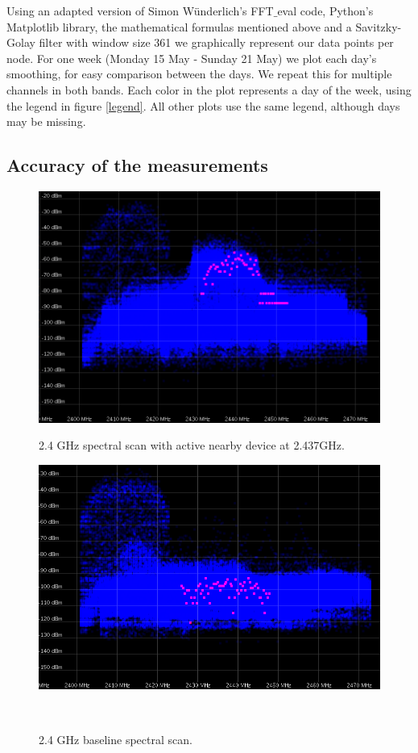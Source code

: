 \documentclass[a4paper, 11pt]{article}
\begin{document}
Using an adapted version of Simon W{\"u}nderlich's FFT$\_$eval code, Python's Matplotlib library, the mathematical formulas mentioned above and a Savitzky-Golay filter with window size 361 we graphically represent our data points per node. For one week (Monday 15 May - Sunday 21 May) we plot each day's smoothing, for easy comparison between the days. We repeat this for multiple channels in both bands. Each color in the plot represents a day of the week, using the legend in figure \ref{legend}. All other plots use the same legend, although days may be missing.



\subsection{Accuracy of the measurements} \label{accuracy}

\begin{figure}[ht]
\begin{minipage}[t]{0.45\textwidth}
\centering
\includegraphics[width=\textwidth]{24check.png}
\caption{2.4 GHz spectral scan with active nearby device at 2.437GHz.}
\label{fig_24}
\end{minipage}\hfill
\begin{minipage}[t]{0.45\textwidth}
\centering
\includegraphics[width=\textwidth]{24check_nodata.png}
\caption{2.4 GHz baseline spectral scan.}
\label{fig_24nodata}
\end{minipage}\
\end{figure}
\end{document}
